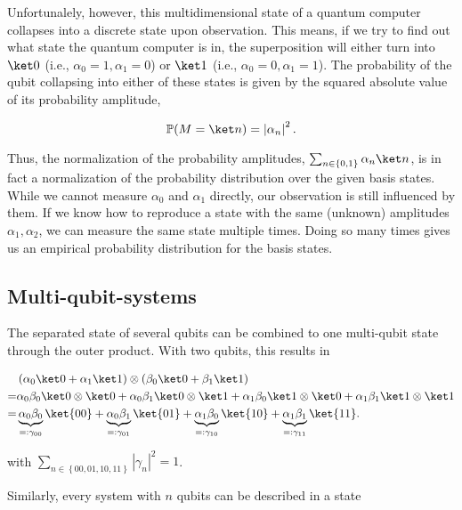 Unfortunalely, however, this multidimensional state of a quantum computer
collapses into a discrete state upon observation.
This means, if we try to find out what state the quantum computer is in, the
superposition will either turn into $\ket 0$ (i.e., $\alpha_0 = 1, \alpha_1 = 0$)
or $\ket 1$ (i.e., $\alpha_0 = 0, \alpha_1 = 1$).
The probability of the qubit collapsing into either of these states is given by
the squared absolute value of its probability amplitude,

$$\mathbb P(M = \ket n) = \left| \alpha_n \right|^2.$$

Thus, the normalization of the probability amplitudes, 
$\sum_{n \in \left\{0, 1\right\}} \alpha_n \ket n$, is in fact a normalization
of the probability distribution over the given basis states.
While we cannot measure $\alpha_0$ and $\alpha_1$ directly, our observation is
still influenced by them.
If we know how to reproduce a state with the same (unknown) amplitudes
$\alpha_1, \alpha_2$, we can measure the same state multiple times.
Doing so many times gives us an empirical probability distribution for the basis
states.

\subsection{Multi-qubit-systems}
The separated state of several qubits can be combined to one multi-qubit state
through the outer product.
With two qubits, this results in

\begin{equation}
    \label{eq:separate-state}
    \begin{split}
        &\left(\alpha_0 \ket 0 + \alpha_1 \ket 1\right) \otimes \left(\beta_0 \ket 0 + \beta_1 \ket 1\right) \\
        = &\alpha_0\beta_0 \ket 0 \otimes \ket 0 + \alpha_0\beta_1 \ket 0 \otimes \ket 1 + \alpha_1\beta_0 \ket 1 \otimes \ket 0 + \alpha_1\beta_1 \ket 1 \otimes \ket 1 \\
        = &\underbrace{\alpha_0\beta_0}_{=: \gamma_{00}} \ket{00} + \underbrace{\alpha_0\beta_1}_{=: \gamma_{01}} \ket{01} + \underbrace{\alpha_1\beta_0}_{=: \gamma_{10}} \ket{10} + \underbrace{\alpha_1\beta_1}_{=: \gamma_{11}} \ket{11}.
    \end{split}
\end{equation}

with $\sum_{n \in \left\{00, 01, 10, 11\right\}} \left|\gamma_n\right|^2 = 1$.

Similarly, every system with $n$ qubits can be described in a state

